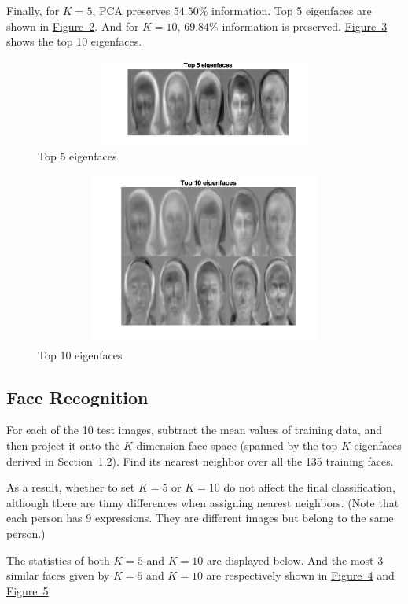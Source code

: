 \documentclass{article}
\theoremstyle{plain} \newtheorem{prop}{Proposition}
\begin{document}
Finally, for $K=5$, PCA preserves $54.50\%$ information. Top 5 eigenfaces are shown in \hyperref[fig-2]{Figure~2}. And for $K=10$, $69.84\%$ information is preserved. \hyperref[fig-3]{Figure~3} shows the top 10 eigenfaces.
\begin{figure}
\centering
\includegraphics[width=350pt, height=80.5pt]{eigenfaces_5.png}
\caption{Top 5 eigenfaces}
\label{fig-2}
\end{figure}
\begin{figure}
	\centering
	\includegraphics[width=350pt, height=161pt]{eigenfaces_10.png}
	\caption{Top 10 eigenfaces}
	\label{fig-3}
\end{figure}

\subsection{Face Recognition}
For each of the 10 test images, subtract the mean values of training data, and then project it onto the $K$-dimension face space (spanned by the top $K$ eigenfaces derived in Section~1.2). Find its nearest neighbor over all the 135 training faces.

As a result, whether to set $K=5$ or $K=10$ do not affect the final classification, although there are tinny differences when assigning nearest neighbors. (Note that each person has 9 expressions. They are different images but belong to the same person.)

The statistics of both $K=5$ and $K=10$ are displayed below. And the most 3 similar faces given by $K=5$ and $K=10$ are respectively shown in \hyperref[fig-4]{Figure~4} and \hyperref[fig-5]{Figure~5}.
\end{document}

